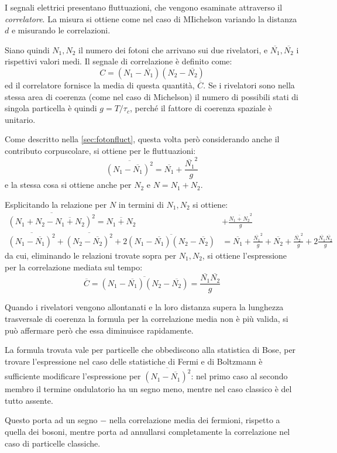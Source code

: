I segnali elettrici presentano fluttuazioni, che vengono esaminate attraverso il \textit{correlatore}. La misura si ottiene come nel caso di MIichelson variando la distanza $ d $ e misurando le correlazioni.

Siano quindi $ N_1, N_2 $ il numero dei fotoni che arrivano sui due rivelatori, e $ \overline{N_1}, \overline{N_2} $ i rispettivi valori medi. Il segnale di correlazione è definito come:
\[ C = (N_1 - \overline{N_1})  (N_2 - \overline{N_2}) \]
ed il correlatore fornisce la media di questa quantità, $ \overline{C} $. Se i rivelatori sono nella stessa area di coerenza (come nel caso di Michelson) il numero di possibili stati di singola particella è quindi $ g = T/\tau_c $, perché il fattore di coerenza spaziale è unitario.

Come descritto nella \cref{sec:fotonfluct}, questa volta però considerando anche il contributo corpuscolare, si ottiene per le fluttuazioni:
\[ \overline{(N_1 - \overline{N_1})^2} = \overline{N_1} + \frac{\overline{N_1}^2}{g} \]
e la stessa cosa si ottiene anche per $ N_2 $ e $ N = N_1 + N_2 $.

Esplicitando la relazione per $ N $ in termini di $ N_1,N_2 $ si ottiene:
\begin{align*}
\overline{(N_1 + N_2 - \overline{N_1 + N_2})^2} = \overline{N_1 + N_2} &+ \frac{\overline{N_1 + N_2}^2}{g}\\
\overline{(N_1 - \overline{N_1})^2} + \overline{(N_2 - \overline{N_2})^2} + 2 \overline{(N_1 - \overline{N_1})(N_2 - \overline{N_2})}& = \overline{N_1} + \frac{\overline{N_1}^2}{g} + \overline{N_2} + \frac{\overline{N_2}^2}{g} + 2 \frac{\overline{N_1}\overline{N_2}}{g}
\end{align*}
da cui, eliminando le relazioni trovate sopra per $ N_1, N_2 $, si ottiene l'espressione per la correlazione mediata sul tempo:
\[ \overline{C} = \overline{(N_1 - \overline{N_1})  (N_2 - \overline{N_2})} = \frac{\overline{N_1}\overline{N_2}}{g} \]

Quando i rivelatori vengono allontanati e la loro distanza supera la lunghezza trasversale di coerenza la formula per la correlazione media non è più valida, si può affermare però che essa diminuisce rapidamente.

\begin{oss}
	La formula trovata vale per particelle che obbediscono alla statistica di Bose, per trovare l'espressione nel caso delle statistiche di Fermi e di Boltzmann è sufficiente modificare l'espressione per $ \overline{(N_1 - \overline{N_1})^2} $: nel primo caso al secondo membro il termine ondulatorio ha un segno meno, mentre nel caso classico è del tutto assente.
	
	Questo porta ad un segno $ - $ nella correlazione media dei fermioni, rispetto a quella dei bosoni, mentre porta ad annullarsi completamente la correlazione nel caso di particelle classiche.
\end{oss}

